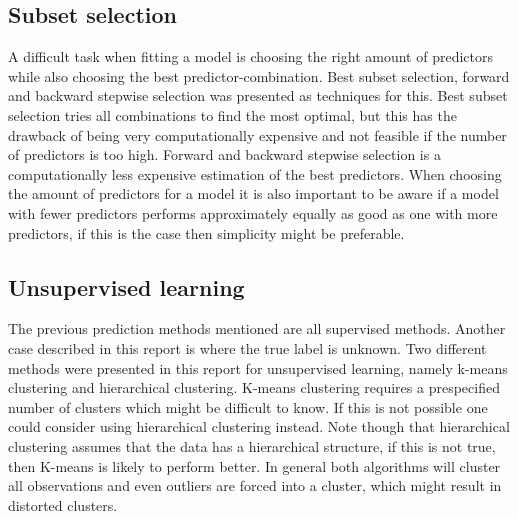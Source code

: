 \subsection{Subset selection}
A difficult task when fitting a model is choosing the right amount of predictors while also choosing the best predictor-combination. Best subset selection, forward and backward stepwise selection was presented as techniques for this. Best subset selection tries all combinations to find the most optimal, but this has the drawback of being very computationally expensive and not feasible if the number of predictors is too high. Forward and backward stepwise selection is a computationally less expensive estimation of the best predictors. When choosing the amount of predictors for a model it is also important to be aware if a model with fewer predictors performs approximately equally as good as one with more predictors, if this is the case then simplicity might be preferable.

\subsection{Unsupervised learning}
The previous prediction methods mentioned are all supervised methods. Another case described in this report is where the true label is unknown. Two different methods were presented in this report for unsupervised learning, namely k-means clustering and hierarchical clustering. K-means clustering requires a prespecified  number of clusters which might be difficult to know. If this is not possible one could consider using hierarchical clustering instead. Note though that hierarchical clustering assumes that the data has a hierarchical structure, if this is not true, then K-means is likely to perform better. In general both algorithms will cluster all observations and even outliers are forced into a cluster, which might result in distorted clusters.